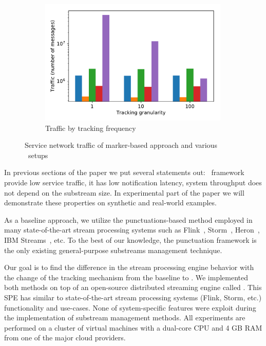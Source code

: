 \begin{figure}[t!]
\begin{subfigure}[b]{0.32\textwidth}
            \includegraphics[width=0.99\textwidth]{pics/traffic_by_tracking_frequency_bars.pdf}
            \caption{Traffic by tracking frequency}
            \label{traffic_granularity}
    \end{subfigure}
    \caption{Service network traffic of marker-based approach and various \tracker\ setups}
    \label{traffic_plots}
\end{figure}
In previous sections of the paper we put several statements out: \tracker\ framework provide low service traffic, it has low notification latency, system throughput does not depend on the substream size. In experimental part of the paper we will demonstrate these properties on synthetic and real-world examples. 

As a baseline approach, we utilize the punctuations-based method employed in many state-of-the-art stream processing systems such as Flink~\cite{Carbone:2017:SMA:3137765.3137777}, Storm~\cite{apache:storm:state}, Heron~\cite{Kulkarni:2015:THS:2723372.2742788}, IBM Streams~\cite{jacques2016consistent}, etc. To the best of our knowledge, the punctuation framework is the only existing general-purpose substreams management technique.

Our goal is to find the difference in the stream processing engine behavior with the change of the tracking mechanism from the baseline to \tracker. We implemented both methods on top of an open-source distributed streaming engine called \FlameStream. This SPE has similar to state-of-the-art stream processing systems (Flink, Storm, etc.) functionality and use-cases. None of system-specific features were exploit during the implementation of substream management methods. All experiments are performed on a cluster of virtual machines with a dual-core CPU and 4 GB RAM from one of the major cloud providers.

